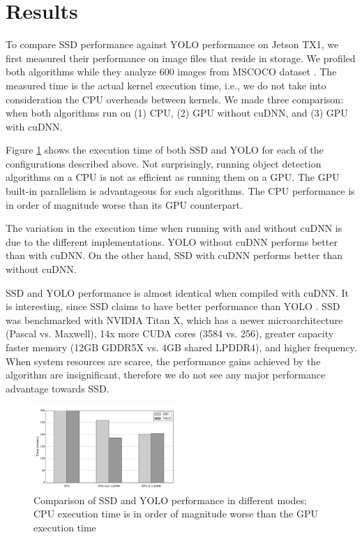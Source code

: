 \section{Results} 
\label{sec:results}

To compare SSD performance against YOLO performance on Jetson TX1, we first measured their performance on image files that reside in storage. We profiled both algorithms while they analyze 600 images from MSCOCO dataset \cite{mscoco}. The measured time is the actual kernel execution time, i.e., we do not take into consideration the CPU overheads between kernels. We made three comparison: when both algorithms run on (1) CPU, (2) GPU without cuDNN, and (3) GPU with cuDNN\footnotemark.


Figure \ref{fig:t_exec} shows the execution time of both SSD and YOLO for each of the configurations described above.
Not surprisingly, running object detection algorithms on a CPU is not as efficient as running them on a GPU. The GPU built-in parallelism is advantageous for such algorithms. The CPU performance is in order of magnitude worse than its GPU counterpart. 

The variation in the execution time when running with and without cuDNN is due to the different implementations. YOLO without cuDNN performs better than with cuDNN. On the other hand, SSD with cuDNN performs better than without cuDNN.

SSD and YOLO performance is almost identical when compiled with cuDNN. It is interesting, since SSD claims to have better performance than YOLO \cite{liu2016ssd}. SSD was benchmarked with NVIDIA Titan X, which has a newer microarchitecture (Pascal vs. Maxwell), 14x more CUDA cores (3584 vs. 256), greater capacity faster memory (12GB GDDR5X vs. 4GB shared LPDDR4), and higher frequency. When system resources are scarce, the performance gains achieved by the algorithm are insignificant, therefore we do not see any major performance advantage towards SSD.

\begin{figure}[h]
	\includegraphics[width=0.48\textwidth]{./imgs/t_exec.pdf}
	\caption{Comparison of SSD and YOLO performance in different modes; CPU execution time is in order of magnitude worse than the GPU execution time}
	\label{fig:t_exec}
\end{figure}

